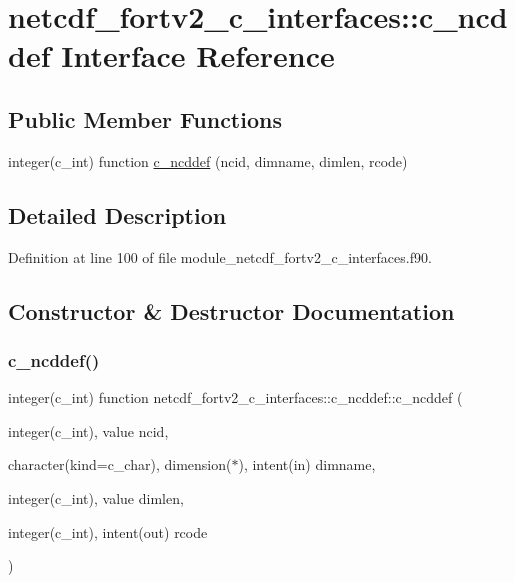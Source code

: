 \hypertarget{interfacenetcdf__fortv2__c__interfaces_1_1c__ncddef}{}\section{netcdf\+\_\+fortv2\+\_\+c\+\_\+interfaces\+:\+:c\+\_\+ncddef Interface Reference}
\label{interfacenetcdf__fortv2__c__interfaces_1_1c__ncddef}
\subsection*{Public Member Functions}
\begin{DoxyCompactItemize}
\item 
integer(c\+\_\+int) function \hyperlink{interfacenetcdf__fortv2__c__interfaces_1_1c__ncddef_a8999afb6e1d3bd78efac54f67403ae95}{c\+\_\+ncddef} (ncid, dimname, dimlen, rcode)
\end{DoxyCompactItemize}


\subsection{Detailed Description}


Definition at line 100 of file module\+\_\+netcdf\+\_\+fortv2\+\_\+c\+\_\+interfaces.\+f90.



\subsection{Constructor \& Destructor Documentation}
\mbox{\label{interfacenetcdf__fortv2__c__interfaces_1_1c__ncddef_a8999afb6e1d3bd78efac54f67403ae95}} 
\subsubsection{\texorpdfstring{c\+\_\+ncddef()}{c\_ncddef()}}
{\footnotesize\ttfamily integer(c\+\_\+int) function netcdf\+\_\+fortv2\+\_\+c\+\_\+interfaces\+::c\+\_\+ncddef\+::c\+\_\+ncddef (\begin{DoxyParamCaption}\item[{integer(c\+\_\+int), value}]{ncid,  }\item[{character(kind=c\+\_\+char), dimension($\ast$), intent(in)}]{dimname,  }\item[{integer(c\+\_\+int), value}]{dimlen,  }\item[{integer(c\+\_\+int), intent(out)}]{rcode }\end{DoxyParamCaption})}



